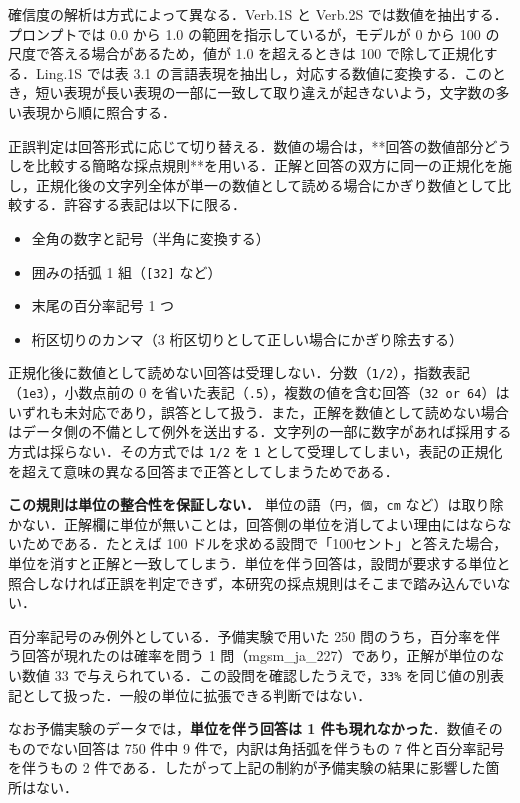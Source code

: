 確信度の解析は方式によって異なる．Verb.1S と Verb.2S では数値を抽出する．プロンプトでは 0.0 から 1.0 の範囲を指示しているが，モデルが 0 から 100 の尺度で答える場合があるため，値が 1.0 を超えるときは 100 で除して正規化する．Ling.1S では表 3.1 の言語表現を抽出し，対応する数値に変換する．このとき，短い表現が長い表現の一部に一致して取り違えが起きないよう，文字数の多い表現から順に照合する．

正誤判定は回答形式に応じて切り替える．数値の場合は，**回答の数値部分どうしを比較する簡略な採点規則**を用いる．正解と回答の双方に同一の正規化を施し，正規化後の文字列全体が単一の数値として読める場合にかぎり数値として比較する．許容する表記は以下に限る．

\begin{itemize}
\item 全角の数字と記号（半角に変換する）
\item 囲みの括弧 1 組（\texttt{[32]} など）
\item 末尾の百分率記号 1 つ
\item 桁区切りのカンマ（3 桁区切りとして正しい場合にかぎり除去する）
\end{itemize}

正規化後に数値として読めない回答は受理しない．分数（\texttt{1/\allowbreak{}2}），指数表記（\texttt{1e3}），小数点前の 0 を省いた表記（\texttt{.\allowbreak{}5}），複数の値を含む回答（\texttt{32 or 64}）はいずれも未対応であり，誤答として扱う．また，正解を数値として読めない場合はデータ側の不備として例外を送出する．文字列の一部に数字があれば採用する方式は採らない．その方式では \texttt{1/\allowbreak{}2} を \texttt{1} として受理してしまい，表記の正規化を超えて意味の異なる回答まで正答としてしまうためである．

\textbf{この規則は単位の整合性を保証しない．} 単位の語（\texttt{円}，\texttt{個}，\texttt{cm} など）は取り除かない．正解欄に単位が無いことは，回答側の単位を消してよい理由にはならないためである．たとえば 100 ドルを求める設問で「100セント」と答えた場合，単位を消すと正解と一致してしまう．単位を伴う回答は，設問が要求する単位と照合しなければ正誤を判定できず，本研究の採点規則はそこまで踏み込んでいない．

百分率記号のみ例外としている．予備実験で用いた 250 問のうち，百分率を伴う回答が現れたのは確率を問う 1 問（mgsm\_ja\_227）であり，正解が単位のない数値 33 で与えられている．この設問を確認したうえで，\texttt{33\%} を同じ値の別表記として扱った．一般の単位に拡張できる判断ではない．

なお予備実験のデータでは，\textbf{単位を伴う回答は 1 件も現れなかった}．数値そのものでない回答は 750 件中 9 件で，内訳は角括弧を伴うもの 7 件と百分率記号を伴うもの 2 件である．したがって上記の制約が予備実験の結果に影響した箇所はない．

